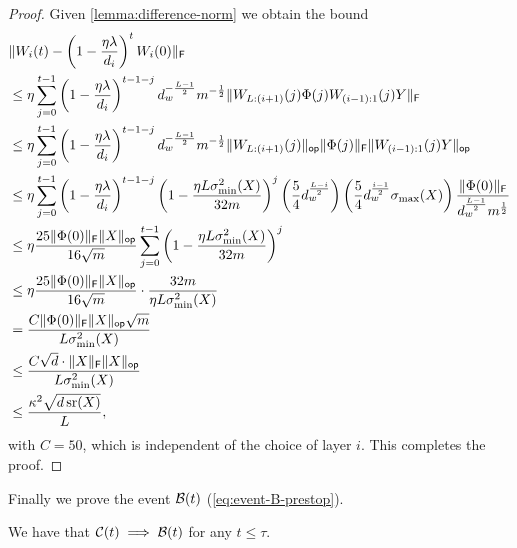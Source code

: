 \begin{proof}
Given \cref{lemma:difference-norm} we obtain the bound
  \begin{align*}
     &\lVert W_{i}(t) - \left(1 - \frac{\eta \lambda}{d_i}\right)^t W_{i}(0)\rVert_{\mathsf{F}}\\
    &\leq \eta \sum_{j = 0}^{t-1} \left(1 - \frac{\eta \lambda}{d_i}\right)^{t - 1 - j}
    d_{w}^{-\frac{L - 1}{2}} m^{-\frac{1}{2}}
    \lVert W_{L:(i+1)}(j)\Phi(j) W_{(i-1):1}(j) Y\rVert_{\mathsf{F}} \\
    &\leq \eta \sum_{j = 0}^{t-1} \left(1 - \frac{\eta \lambda}{d_i}\right)^{t - 1 - j}
    d_{w}^{-\frac{L - 1}{2}} m^{-\frac{1}{2}}
    \lVert W_{L:(i+1)}(j)\rVert_{\mathsf{op}} \lVert\Phi(j)\rVert_{\mathsf{F}} \lVert W_{(i-1):1}(j) Y\rVert_{\mathsf{op}} \\
    &\leq
    \eta \sum_{j = 0}^{t-1} \left(1 - \frac{\eta \lambda}{d_i}\right)^{t-1-j}
    \left(1 - \frac{\eta L \sigma_{\min}^2(X)}{32 m}\right)^{j}
    \left( \frac{5}{4} d_{w}^{\frac{L-i}{2}} \right) \left(\frac{5}{4} d_{w}^{\frac{i-1}{2}} \sigma_{\max}(X)\right)
    \frac{\lVert\Phi(0)\rVert_{\mathsf{F}}}{d_{w}^{\frac{L-1}{2}} m^{\frac{1}{2}}} \\
    &\leq
    \eta \frac{25 \lVert\Phi(0)\rVert_{\mathsf{F}} \lVert X\rVert_{\mathsf{op}}}{16 \sqrt{m}}
    \sum_{j = 0}^{t - 1} \left(1 - \frac{\eta L \sigma_{\min}^2(X)}{32 m}\right)^{j} \\
    &\leq
    \eta \frac{25 \lVert\Phi(0)\rVert_{\mathsf{F}} \lVert X\rVert_{\mathsf{op}}}{16 \sqrt{m}}
    \cdot \frac{32 m}{\eta L \sigma_{\min}^2(X)} \\
    &=
    \frac{C \lVert\Phi(0)\rVert_{\mathsf{F}} \lVert X\rVert_{\mathsf{op}} \sqrt{m} }{L \sigma_{\min}^2(X)}\\
    & \leq \frac{C\sqrt{d} \cdot \lVert X\rVert_{\mathsf{F}} \lVert X\rVert_{\mathsf{op}}}{L \sigma^2_{\min}(X)}\\
    & \leq \frac{\kappa^2 \sqrt{d \operatorname{\mathrm{sr}}(X)}}{L},
  \end{align*}
  with $C=50$,
  which is independent of the choice of layer $i$. This completes the proof.
\end{proof}
Finally we prove the event $\mathcal{B}(t)$ (\cref{eq:event-B-prestop}).
\begin{lemma}\label{lem:step1-b(t)-proof}
  \label{lemma:Ct-implies-Bt-phase-1}
    We have that $\mathcal{C}(t) \implies
    \mathcal{B}(t)$ for any $t \leq \tau$.
\end{lemma}
